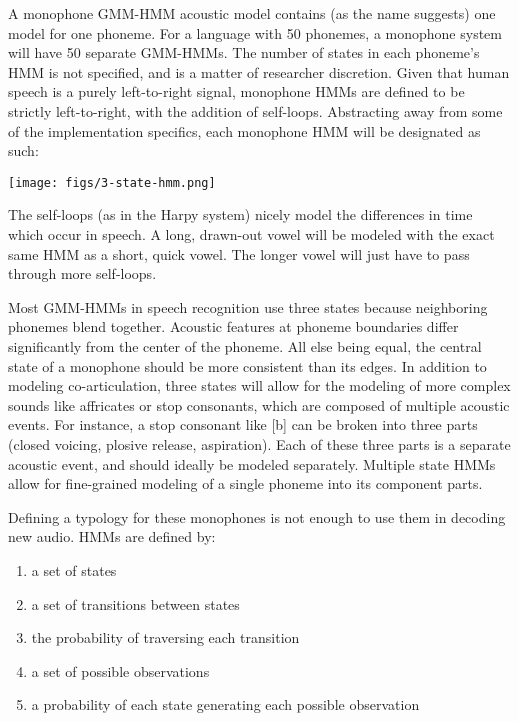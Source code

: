 \documentclass[10pt,a4paper]{article}
\begin{document}
  A monophone GMM-HMM acoustic model contains (as the name suggests) one model for one phoneme. For a language with 50 phonemes, a monophone system will have 50 separate GMM-HMMs. The number of states in each phoneme's HMM is not specified, and is a matter of researcher discretion. Given that human speech is a purely left-to-right signal, monophone HMMs are defined to be strictly left-to-right, with the addition of self-loops. Abstracting away from some of the implementation specifics, each monophone HMM will be designated as such:

\begin{center}
\texttt{[image: figs/3-state-hmm.png]}
\end{center}

The self-loops (as in the Harpy system) nicely model the differences in time which occur in speech. A long, drawn-out vowel will be modeled with the exact same HMM as a short, quick vowel. The longer vowel will just have to pass through more self-loops.

Most GMM-HMMs in speech recognition use three states because neighboring phonemes blend together. Acoustic features at phoneme boundaries differ significantly from the center of the phoneme. All else being equal, the central state of a monophone should be more consistent than its edges. In addition to modeling co-articulation, three states will allow for the modeling of more complex sounds like affricates or stop consonants, which are composed of multiple acoustic events. For instance, a stop consonant like [b] can be broken into three parts (closed voicing, plosive release, aspiration). Each of these three parts is a separate acoustic event, and should ideally be modeled separately. Multiple state HMMs allow for fine-grained modeling of a single phoneme into its component parts.

Defining a typology for these monophones is not enough to use them in decoding new audio. HMMs are defined by:

\begin{enumerate}
\item a set of states
\item a set of transitions between states
\item the probability of traversing each transition
\item a set of possible observations
\item a probability of each state generating each possible observation 
\end{enumerate}
\end{document}
